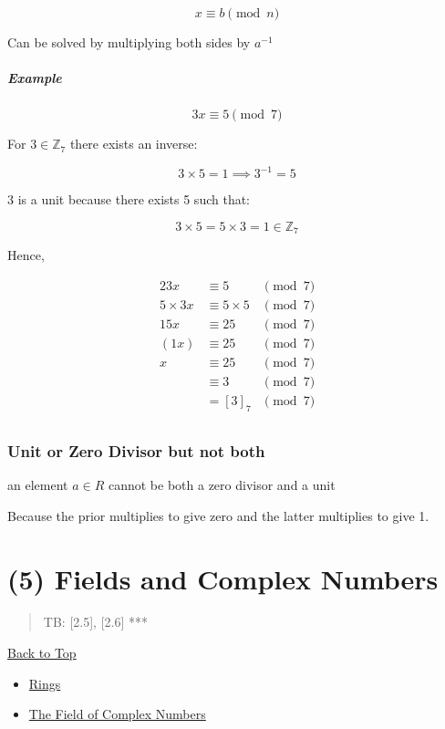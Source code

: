 \documentclass[
]{article}
\begin{document}
\[x \equiv b \pmod{n}\]

Can be solved by multiplying both sides by \(a^{-1}\)

\hypertarget{header-n834}{%
\subparagraph{Example}\label{header-n834}}

\[3x \equiv 5 \pmod{7}\]

For \(3\in \mathbb{Z}_7\) there exists an inverse:

\[3 \times 5 = 1 \implies 3^{-1} = 5\]

3 is a unit because there exists 5 such that:

\[3 \times 5 = 5\times 3 = 1 \in \mathbb{Z}_7\]

Hence,

\begin{alignat}{2}
3x &\equiv 5 &\pmod{7} \\ 
5 \times 3x &\equiv 5 \times 5 &\pmod{7} \\
15x &\equiv 25 &\pmod{7} \\
(1x) &\equiv 25 &\pmod{7} \\
x &\equiv 25 &\pmod{7} \\
&\equiv 3 &\pmod{7} \\
&= [3]_7 &\pmod{7} \\
\end{alignat}

\hypertarget{header-n843}{%
\subsubsection{Unit or Zero Divisor but not both}\label{header-n843}}

an element \(a \in R\) cannot be both a zero divisor and a unit

Because the prior multiplies to give zero and the latter multiplies to
give 1.

\hypertarget{header-n847}{%
\section{(5) Fields and Complex Numbers}\label{header-n847}}

\begin{quote}
TB: {[}2.5{]}, {[}2.6{]} ***
\end{quote}

\protect\hyperlink{antoc}{Back to Top}

\begin{itemize}
\item
  \protect\hyperlink{aaux285ux29rings2}{Rings}
\item
  \href{aa(5)fieldc}{The Field of Complex Numbers}
\end{itemize}
\end{document}
